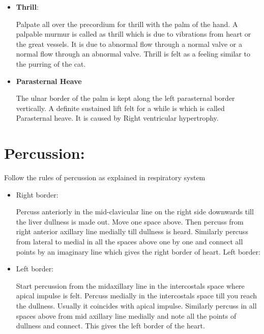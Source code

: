 \documentclass[a4paper,12pt]{book}
\begin{document}
\begin{itemize}
{	Normally the apical impulse just touches and lifts the examining finger. The abnormal characters are : Tapping , Hyperdynamic and Heaving apical impulse.
	}
\item{\textbf{Thrill}:
	\par
	Palpate all over the precordium for thrill with the palm of the hand. A palpable murmur is called as thrill which is due to vibrations from heart or the great vessels. It is due to abnormal flow through a normal valve or a normal flow through an abnormal valve. Thrill is felt as a feeling similar to the purring of the cat.
	}										    
\item{\textbf{Parasternal Heave}
	\par
The ulnar border of the palm is kept along the left parasternal border vertically. A definite sustained lift felt for a while is which is called Parasternal heave. It is caused by Right ventricular hypertrophy.
}
\end{itemize}
\section*{Percussion:}
\par
Follow the rules of percussion as explained in respiratory system 
\begin{itemize}
\item{Right border:
	\par
Percuss anteriorly in the mid-clavicular line on the right side downwards till the liver dullness is made out. Move one space above. Then percuss from right anterior axillary line medially till dullness is heard. Similarly percuss from lateral to medial in all the spaces above one by one and connect all points by an imaginary line which gives the right border of heart. Left border:
}
\item{Left border:
	\par
Start percussion from the midaxillary line in the intercostals space where apical impulse is felt. Percuss medially in the intercostals space till you reach the dullness. Usually it coincides with apical impulse. Similarly percuss in all spaces above from mid axillary line medially and note all the points of dullness and connect. This gives the left border of the heart.
}
\end{itemize}
\end{document}
